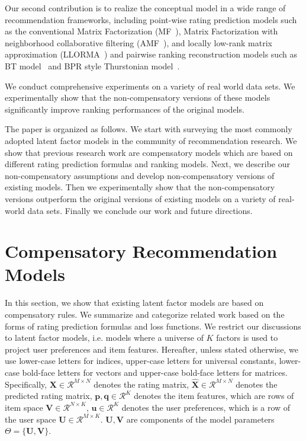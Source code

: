 \documentclass[letterpaper]{article} %
\newcommand{\Real}{\mathcal{R}}
\begin{document}
Our second contribution is to realize the conceptual model in a wide range of recommendation frameworks, including point-wise rating prediction models such as the conventional Matrix Factorization (MF~\cite{Koren2009Matrix}), Matrix Factorization with neighborhood collaborative filtering (AMF~\cite{Koren2008Factorization}), and locally low-rank matrix approximation (LLORMA~\cite{Lee2013Local}) and pairwise ranking reconstruction models such as BT model~\cite{Hu2016Improved} and BPR style  Thurstonian model~\cite{Rendle2009BPR}. 

We conduct comprehensive experiments on a variety of real world data sets. We experimentally show that the non-compensatory versions of these models significantly improve ranking performances of the original models. 

The paper is organized as follows. We start with surveying the most commonly adopted latent factor models in the community of recommendation research. We show that previous research work are compensatory models which are based on different rating prediction formulas and  ranking models. Next, we describe our non-compensatory assumptions and develop non-compensatory versions of existing models. Then we experimentally show that the non-compensatory versions outperform the original versions of existing models on a variety of real-world data sets. Finally we conclude our work and future directions.

\section{Compensatory Recommendation Models}\label{sec:previousmodel}
In this section, we show that existing latent factor models are based on compensatory rules. We summarize and categorize related work based on the forms of rating prediction formulas and loss functions. We restrict our discussions to latent factor models, i.e. models where a universe of $K$ factors is used to project  user preferences and item features. Hereafter, unless stated otherwise, we use lower-case letters for indices, upper-case letters for universal constants, lower-case bold-face letters for vectors and upper-case bold-face letters for matrices. Specifically, $\mathbf{X}\in \Real^{M\times N}$ denotes the rating matrix, $\hat{\mathbf{X}}\in \Real^{M\times N}$ denotes the predicted rating matrix,  $\mathbf{p},\mathbf{q}\in \Real^K$ denotes the item features, which are rows of item space $\mathbf{V}\in \Real^{N\times K}$, $\mathbf{u}\in \Real^K$ denotes the user preferences, which is a row of the user space $\mathbf{U}\in \Real^{M\times K}$.  $\mathbf{U},\mathbf{V}$ are components of the model parameters $\Theta=\{\mathbf{U},\mathbf{V} \}$.
\end{document}
